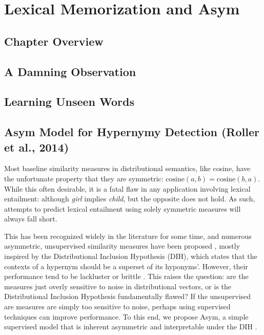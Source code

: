 \chapter{Lexical Memorization and Asym}
\label{ch:lexmem}

\section{Chapter Overview}

\section{A Damning Observation}

\section{Learning Unseen Words}

\section{Asym Model for Hypernymy Detection (Roller et al., 2014)}
\label{sec:asym}

Most baseline similarity measures in distributional semantics, like cosine,
have the unfortunate property that they are symmetric: $\text{cosine}(a, b) =
\text{cosine}(b, a)$. While this often desirable, it
is a fatal flaw in any application involving lexical entailment: although {\em
girl} implies {\em child}, but the opposite does not hold. As such, attempts to
predict lexical entailment using solely symmetric measures will always fall
short.

This has been recognized widely in the
literature for some time, and numerous asymmetric, unsupervised similarity measures have been
proposed
\cite{weeds:2003:emnlp,zhitomirsky-geffet:2005:acl,clarke:2009:gems,kotlerman:2010:nle,santus:2013:thesis},
mostly inspired by the Distributional Inclusion Hypothesis (DIH), which
states that the contexts of a hypernym should be a superset of its hyponyms'.
However, their
performance tend to be lackluster \cite{clarke:2009:gems} or brittle
\cite{kotlerman:2010:nle}. This raises the question: are the measures just
overly sensitive to noise in distributional vectors, or is the Distributional
Inclusion Hypothesis fundamentally flawed? If the unsupervised are measures
are simply too sensitive to noise, perhaps using supervised techniques can
improve performance.  To this end, we propose Asym, a simple supervised model
that is inherent asymmetric and interpretable under the DIH
\cite{roller:2014:coling}. 

